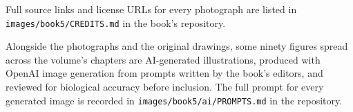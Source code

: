 Full source links and license URLs for every photograph are listed
in \texttt{images/book5/CREDITS.md} in the book's repository.

\bigskip
Alongside the photographs and the original drawings, some ninety
figures spread across the volume's chapters are AI-generated
illustrations, produced with OpenAI image generation from prompts
written by the book's editors, and reviewed for biological accuracy
before inclusion. The full prompt for every generated image is
recorded in \texttt{images/book5/ai/PROMPTS.md} in the repository.
\clearpage
